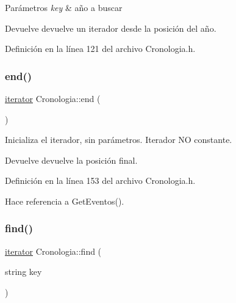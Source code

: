 \begin{DoxyParams}{Parámetros}
{\em key} & año a buscar \\
\hline
\end{DoxyParams}
\begin{DoxyReturn}{Devuelve}
devuelve un iterador desde la posición del año. 
\end{DoxyReturn}


Definición en la línea 121 del archivo Cronologia.\+h.

\hypertarget{classCronologia_afa08dc5a9a3812911dabdf7599222e85}{}\label{classCronologia_afa08dc5a9a3812911dabdf7599222e85} 
\subsubsection{\texorpdfstring{end()}{end()}}
{\footnotesize\ttfamily \hyperlink{classCronologia_1_1iterator}{iterator} Cronologia\+::end (\begin{DoxyParamCaption}{ }\end{DoxyParamCaption})\hspace{0.3cm}{\ttfamily [inline]}}



Inicializa el iterador, sin parámetros. Iterador NO constante. 

\begin{DoxyReturn}{Devuelve}
devuelve la posición final. 
\end{DoxyReturn}


Definición en la línea 153 del archivo Cronologia.\+h.



Hace referencia a Get\+Eventos().

\hypertarget{classCronologia_a99d0ac31015bdf1addaa07e05c1fd068}{}\label{classCronologia_a99d0ac31015bdf1addaa07e05c1fd068} 
\subsubsection{\texorpdfstring{find()}{find()}}
{\footnotesize\ttfamily \hyperlink{classCronologia_1_1iterator}{iterator} Cronologia\+::find (\begin{DoxyParamCaption}\item[{string}]{key }\end{DoxyParamCaption})\hspace{0.3cm}{\ttfamily [inline]}}




